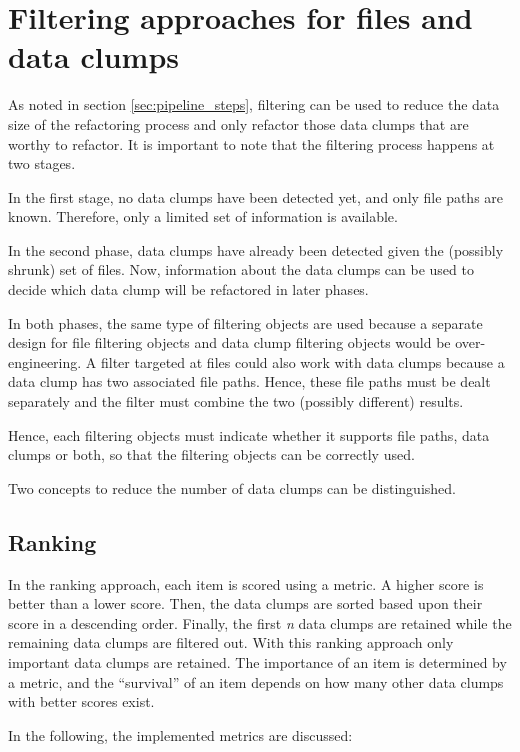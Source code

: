\section{Filtering approaches for files and data clumps}
\label{sec:data_clump_filtering}

As noted in section \ref{sec:pipeline_steps}, filtering can be used to reduce the data size of the refactoring process and only refactor those data clumps that are worthy to refactor. It is important to note that the filtering process happens at two stages.

In the first stage, no data clumps have been detected yet, and only file paths are known. Therefore, only a limited set of information is available. 

In the second phase, data clumps have already  been detected given the (possibly shrunk) set of files. Now, information about the data clumps can be used  to decide which data clump will be refactored in later phases.

In both phases, the same type of filtering objects are used because  a separate design for file filtering objects and data clump filtering objects would be over-engineering. A filter targeted at files could also work with data clumps because a data clump has two associated file paths. Hence, these file paths must be dealt separately and the filter must combine the two (possibly different) results.

Hence, each filtering objects must indicate whether it supports file paths, data clumps or both, so that the filtering objects can be correctly used. 


Two concepts to  reduce the number of data clumps can be distinguished.
\subsection{Ranking} \label{sec:metrics}
In the ranking approach, each item is scored using a metric. A higher score is better than a lower score.  Then, the data clumps are sorted based upon their score in a descending order. Finally, the first  \textit{n} data clumps are retained while the remaining data clumps are filtered out. With this ranking approach only important data clumps are retained. The importance of an item is determined by a metric, and the \enquote{survival} of an item depends on how many other data clumps with better scores exist.

In the following, the implemented metrics are discussed:

